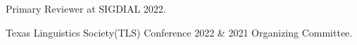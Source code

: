 Primary Reviewer at SIGDIAL 2022.

Texas Linguistics Society(TLS) Conference 2022 \& 2021 Organizing Committee.